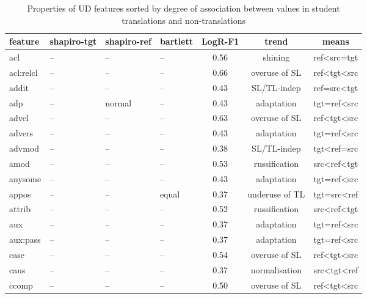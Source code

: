 \begin{longtable}{l|p{2cm}p{2cm}p{1.5cm}ccc}
	\caption{\label{tab:stu_indicators}Properties of UD features sorted by degree of association between values in student translations and non-translations}\\
	\toprule
	feature       & shapiro-tgt & shapiro-ref & bartlett & LogR-F1 & trend          & means \\
	\midrule
	acl           & --     & --     & --    & 0.56 & shining        & ref\textless{}src=tgt           \\
	acl:relcl     & --     & --     & --    & 0.66 & overuse of SL  & ref\textless{}tgt\textless{}src \\
	addit         & --     & --     & --    & 0.43 & SL/TL-indep    & ref=src\textless{}tgt           \\
	adp           & --     & normal & --    & 0.43 & adaptation     & tgt=ref\textless{}src           \\
	advcl         & --     & --     & --    & 0.63 & overuse of SL  & ref\textless{}tgt\textless{}src \\
	advers        & --     & --     & --    & 0.43 & adaptation     & tgt=ref\textless{}src           \\
	advmod        & --     & --     & --    & 0.38 & SL/TL-indep    & tgt\textless{}ref=src           \\
	amod          & --     & --     & --    & 0.53 & russification  & src\textless{}ref\textless{}tgt \\
	anysome       & --     & --     & --    & 0.43 & adaptation     & tgt=ref\textless{}src           \\
	appos         & --     & --     & equal & 0.37 & underuse of TL & tgt=src\textless{}ref           \\
	attrib        & --     & --     & --    & 0.52 & russification  & src\textless{}ref\textless{}tgt \\
	aux           & --     & --     & --    & 0.37 & adaptation     & tgt=ref\textless{}src           \\
	aux:pass      & --     & --     & --    & 0.37 & adaptation     & tgt=ref\textless{}src           \\
	case          & --     & --     & --    & 0.54 & overuse of SL  & ref\textless{}tgt\textless{}src \\
	caus          & --     & --     & --    & 0.37 & normalisation  & src\textless{}tgt\textless{}ref \\
	ccomp         & --     & --     & --    & 0.50 & overuse of SL  & ref\textless{}tgt\textless{}src \\

\end{longtable}
